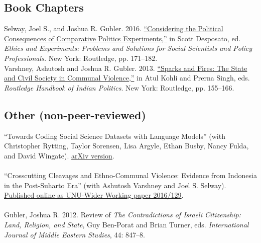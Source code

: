 \documentclass[10pt]{article}
\begin{document}
\begin{flushleft}
\subsection*{Book Chapters}
\end{flushleft}
\noindent
Selway, Joel S., and Joshua R. Gubler. 2016. \href{https://books.google.com/books?id=L2BACwAAQBAJ&pg=PA171&lpg=PA171&dq=%60%60Considering+the+Political+Consequences+of+Comparative+Politics+Experiments''&source=bl&ots=rNiX9bv-pU&sig=WJcUyYdCHT9_7QITkZydiTM0OhU&hl=en&sa=X&ved=0ahUKEwitnrLnzJXTAhVGnpQKHQumAsIQ6AEIHDAA#v=onepage&q=%60%60Considering%20the%20Political%20Consequences%20of%20Comparative%20Politics%20Experiments''&f=false}{``Considering the Political Consequences of Comparative Politics Experiments,''} in Scott Desposato, ed. \textit{Ethics and Experiments: Problems and Solutions for Social Scientists and Policy Professionals.} New York: Routledge, pp. 171--182.
\ \\

\noindent
Varshney, Ashutosh and Joshua R. Gubler. 2013. \href{https://books.google.com/books?id=glfPl6xapzgC&pg=PR4&lpg=PR4&dq=routledge+handbook+of+india+politics&source=bl&ots=OjwrzwvdsG&sig=RftAlQYPs4sCC0Qs0c18ADGFi1g&hl=en&sa=X&ved=0ahUKEwiKgtDlzZXTAhUUImMKHVYtBcQQ6AEINzAF#v=onepage&q=routledge%20handbook%20of%20india%20politics&f=false}{``Sparks and Fires: The State and Civil Society in Communal Violence,''} in Atul Kohli and Prerna Singh, eds. \textit{Routledge Handbook of Indian Politics}.  New York: Routledge, pp. 155--166.
\\


\begin{flushleft}
\subsection*{Other (non-peer-reviewed)}
\end{flushleft}
\noindent
``Towards Coding Social Science Datasets with Language Models'' (with Christopher Rytting, Taylor Sorensen, Lisa Argyle, Ethan Busby, Nancy Fulda, and David Wingate).  \href{https://arxiv.org/abs/2306.02177}{arXiv version}. \\
\ \\
``Crosscutting Cleavages and Ethno-Communal Violence: Evidence from Indonesia in the Post-Suharto Era'' (with Ashutosh Varshney and Joel S. Selway).  \href{https://www.wider.unu.edu/sites/default/files/wp2016-129.pdf}{Published online as UNU-Wider Working paper 2016/129}. \\
\ \\
Gubler, Joshua R. 2012.  Review of \textit{The Contradictions of Israeli Citizenship: Land, Religion, and State}, Guy Ben-Porat and Brian Turner, eds. \textit{International Journal of Middle Eastern Studies}, 44: 847--8.\\
\\
\end{document}
